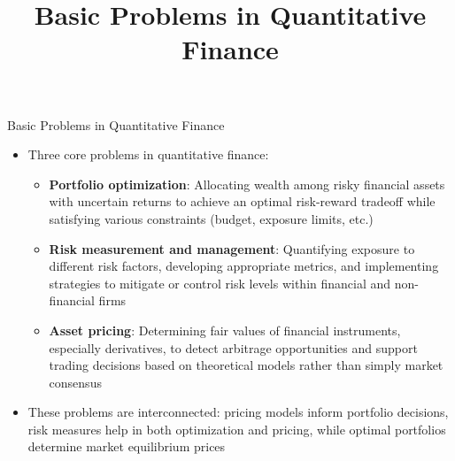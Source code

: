 \documentclass[10pt]{beamer}
\title{Basic Problems in Quantitative Finance}
\author{}
\date{}
\begin{document}
\begin{frame}
\titlepage
\end{frame}

\begin{frame}
\titlepage
\end{frame}

\begin{frame}{Basic Problems in Quantitative Finance}
  \begin{itemize}[<+->]
    \item Three core problems in quantitative finance:
      \begin{itemize}
        \item \textbf{Portfolio optimization}: Allocating wealth among risky financial assets with uncertain returns to achieve an optimal risk-reward tradeoff while satisfying various constraints (budget, exposure limits, etc.)
        \item \textbf{Risk measurement and management}: Quantifying exposure to different risk factors, developing appropriate metrics, and implementing strategies to mitigate or control risk levels within financial and non-financial firms
        \item \textbf{Asset pricing}: Determining fair values of financial instruments, especially derivatives, to detect arbitrage opportunities and support trading decisions based on theoretical models rather than simply market consensus
      \end{itemize}
    \item These problems are interconnected: pricing models inform portfolio decisions, risk measures help in both optimization and pricing, while optimal portfolios determine market equilibrium prices
  \end{itemize}
\end{frame}
\end{document}
